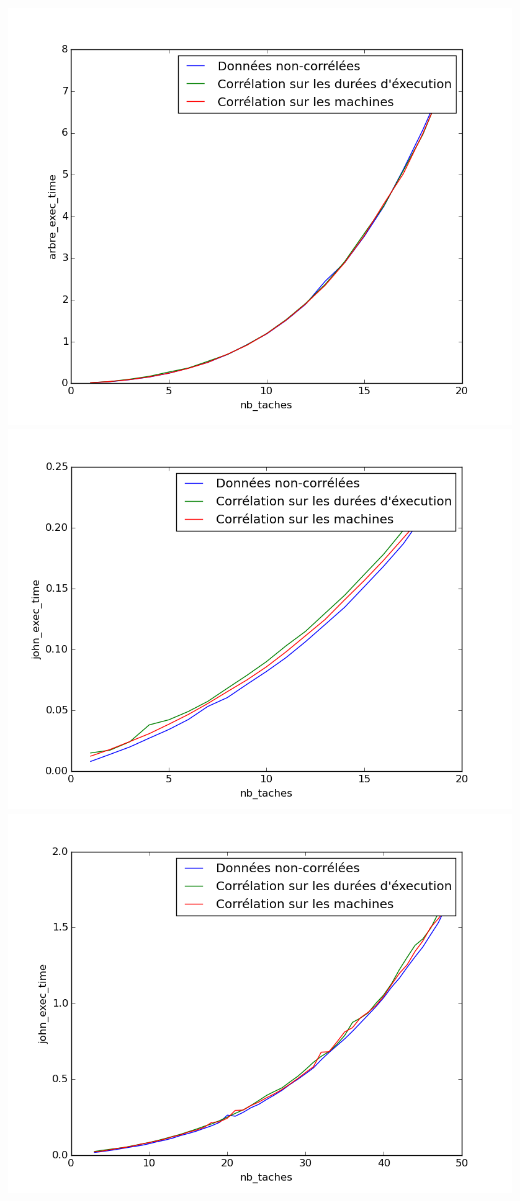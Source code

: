 \includegraphics{./arbre_20_3_b1_a4.png}
\includegraphics{./john_20_3.png} \includegraphics{./john_50_3.png}
